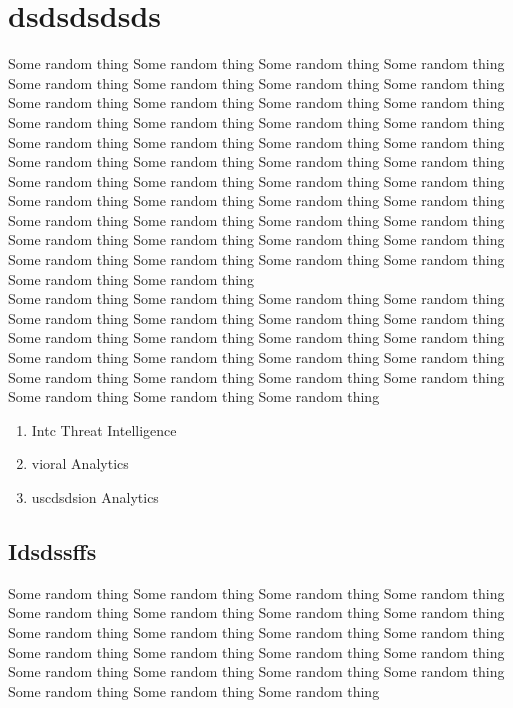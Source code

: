 \section{dsdsdsdsds}
Some random thing Some random thing Some random thing Some random thing Some random thing Some random thing Some random thing Some random thing Some random thing Some random thing Some random thing Some random thing Some random thing Some random thing Some random thing Some random thing Some random thing Some random thing Some random thing Some random thing Some random thing Some random thing Some random thing  \cite{microsf41} Some random thing Some random thing Some random thing Some random thing Some random thing Some random thing Some random thing Some random thing Some random thing Some random thing Some random thing Some random thing Some random thing Some random thing Some random thing Some random thing Some random thing Some random thing Some random thing Some random thing Some random thing Some random thing Some random thing   \\ Some random thing Some random thing Some random thing Some random thing Some random thing Some random thing Some random thing Some random thing Some random thing Some random thing Some random thing Some random thing Some random thing Some random thing Some random thing Some random thing Some random thing Some random thing Some random thing Some random thing Some random thing Some random thing Some random thing  \\
\begin{enumerate}
	\item Intc Threat Intelligence
	\item vioral Analytics
	\item uscdsdsion Analytics
\end{enumerate}
\subsection{Idsdssffs}  Some random thing Some random thing Some random thing Some random thing Some random thing Some random thing Some random thing Some random thing Some random thing Some random thing Some random thing Some random thing Some random thing Some random thing Some random thing Some random thing Some random thing Some random thing Some random thing Some random thing Some random thing Some random thing Some random thing  \newline 

